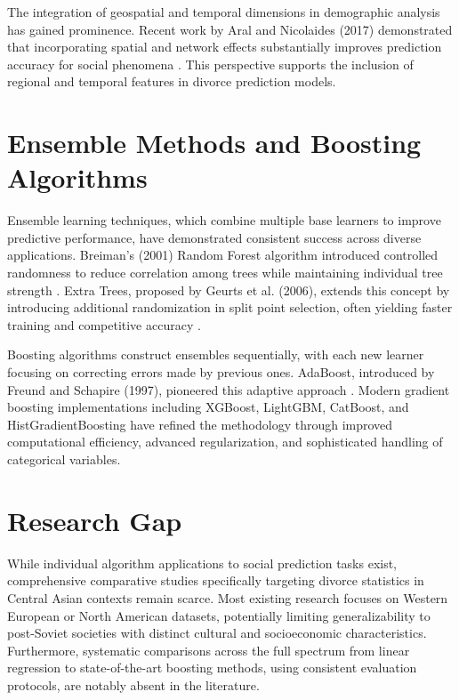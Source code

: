 The integration of geospatial and temporal dimensions in demographic analysis has gained prominence. Recent work by Aral and Nicolaides (2017) demonstrated that incorporating spatial and network effects substantially improves prediction accuracy for social phenomena \cite{aral2017exercise}. This perspective supports the inclusion of regional and temporal features in divorce prediction models.

\section{Ensemble Methods and Boosting Algorithms}

Ensemble learning techniques, which combine multiple base learners to improve predictive performance, have demonstrated consistent success across diverse applications. Breiman's (2001) Random Forest algorithm introduced controlled randomness to reduce correlation among trees while maintaining individual tree strength \cite{breiman2001random}. Extra Trees, proposed by Geurts et al. (2006), extends this concept by introducing additional randomization in split point selection, often yielding faster training and competitive accuracy \cite{geurts2006extremely}.

Boosting algorithms construct ensembles sequentially, with each new learner focusing on correcting errors made by previous ones. AdaBoost, introduced by Freund and Schapire (1997), pioneered this adaptive approach \cite{freund1997decision}. Modern gradient boosting implementations including XGBoost, LightGBM, CatBoost, and HistGradientBoosting have refined the methodology through improved computational efficiency, advanced regularization, and sophisticated handling of categorical variables.

\section{Research Gap}

While individual algorithm applications to social prediction tasks exist, comprehensive comparative studies specifically targeting divorce statistics in Central Asian contexts remain scarce. Most existing research focuses on Western European or North American datasets, potentially limiting generalizability to post-Soviet societies with distinct cultural and socioeconomic characteristics. Furthermore, systematic comparisons across the full spectrum from linear regression to state-of-the-art boosting methods, using consistent evaluation protocols, are notably absent in the literature.

